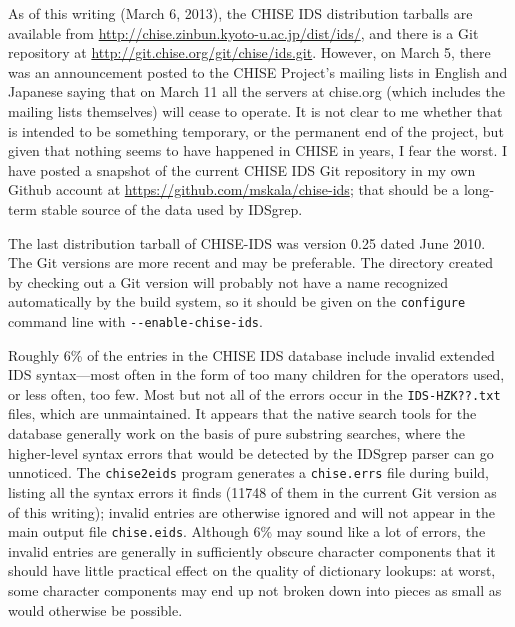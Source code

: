 \documentclass[twocolumn]{report}
\begin{document}
As of this writing (March 6, 2013), the CHISE IDS distribution tarballs are
available from \url{http://chise.zinbun.kyoto-u.ac.jp/dist/ids/}, and there
is a Git repository at \url{http://git.chise.org/git/chise/ids.git}. 
However, on March 5, there was an announcement posted to the CHISE Project's
mailing lists in English and Japanese saying that on March 11 all the
servers at chise.org (which includes the mailing lists themselves) will
cease to operate.  It is not clear to me whether that is intended to be
something temporary, or the permanent end of the project, but given that
nothing seems to have happened in CHISE in years, I fear the worst.  I have
posted a snapshot of the current CHISE IDS Git repository in my own Github
account at \url{https://github.com/mskala/chise-ids}; that should be a
long-term stable source of the data used by IDSgrep.

The last distribution tarball of CHISE-IDS was version 0.25 dated June 2010. 
The Git versions are more recent and may be preferable.  The directory
created by checking out a Git version will probably not have a name
recognized automatically by the build system, so it should be given on the
\texttt{configure} command line with \texttt{-{}-enable-chise-ids}.

Roughly 6\% of the entries in the CHISE IDS database include invalid
extended IDS syntax---most often in the form of too many children for the
operators used, or less often, too few.  Most but not all of the errors
occur in the \texttt{IDS-HZK??.txt} files, which are unmaintained.  It
appears that the native search tools for the database generally work on the
basis of pure substring searches, where the higher-level syntax errors that
would be detected by the IDSgrep parser can go unnoticed.  The
\texttt{chise2eids} program generates a \texttt{chise.errs} file during
build, listing all the syntax errors it finds (11748 of them in the current
Git version as of this writing); invalid entries are otherwise ignored and
will not appear in the main output file \texttt{chise.eids}.  Although 6\%
may sound like a lot of errors, the invalid entries are generally in
sufficiently obscure character components that it should have little
practical effect on the quality of dictionary lookups: at worst, some
character components may end up not broken down into pieces as small as
would otherwise be possible.
\end{document}

